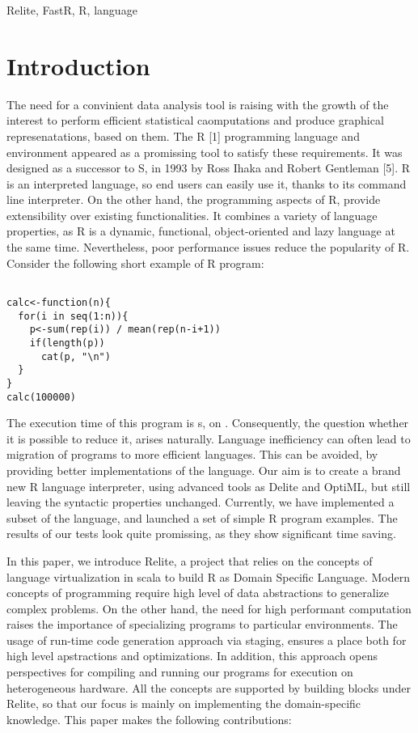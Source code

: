 \documentclass{sigplanconf}
\begin{document}


\keywords
Relite, FastR, R, language

\section{Introduction}

The need for a convinient data analysis tool is raising with the growth of the interest to perform efficient
statistical caomputations and produce graphical represenatations, based on them. The R [1] programming language
and environment appeared as a promissing tool to satisfy these requirements. It was designed as a successor to S,
in 1993 by Ross Ihaka and Robert Gentleman [5]. R is an interpreted language, so end users can easily use it, 
thanks to its command line interpreter. On the other hand, the programming aspects of R, provide extensibility over 
existing functionalities.
It combines a variety of language properties, as R is a dynamic, functional, object-oriented and lazy language at the same time. 
Nevertheless, poor performance issues reduce the popularity of R. 
Consider the following short example of R program:
\begin{lstlisting}

calc<-function(n){
  for(i in seq(1:n)){
    p<-sum(rep(i)) / mean(rep(n-i+1))
    if(length(p))
      cat(p, "\n")
  }
}
calc(100000)
\end{lstlisting}

The execution time of this program is s, on . Consequently, the question whether it is possible to reduce it, arises naturally. 
Language inefficiency can often lead to migration of programs to more efficient languages. This can be avoided, by providing
better implementations of the language. Our aim is to create a brand new R language interpreter, using advanced tools as Delite and OptiML, 
but still leaving the syntactic properties unchanged. Currently, we have implemented a subset of the language, and launched a set of simple
R program examples. The results of our tests look quite promissing, as they show significant time saving.

In this paper, we introduce Relite, a project that relies on the concepts of language virtualization in scala to build R as Domain Specific Language. 
Modern concepts of programming require high level of data abstractions to generalize complex problems. On the other hand, the need for high performant
computation raises the importance of specializing programs to particular environments. 
The usage of run-time code generation approach via staging, ensures a place both for high level apstractions and optimizations. In addition, this approach
opens perspectives for compiling and running our programs for execution on heterogeneous hardware. All the concepts are supported by building blocks under Relite,
so that our focus is mainly on implementing the domain-specific knowledge.
This paper makes the following contributions:
\end{document}
